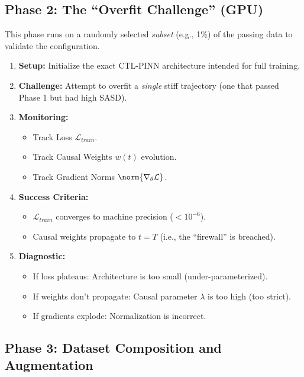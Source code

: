 \subsection{Phase 2: The ``Overfit Challenge'' (GPU)}
This phase runs on a randomly selected \textit{subset} (e.g., 1\%) of the passing data to validate the configuration.

\begin{enumerate}
    \item \textbf{Setup:} Initialize the exact CTL-PINN architecture intended for full training.
    \item \textbf{Challenge:} Attempt to overfit a \textit{single} stiff trajectory (one that passed Phase 1 but had high SASD).
    \item \textbf{Monitoring:}
    \begin{itemize}
        \item Track Loss $\mathcal{L}_{train}$.
        \item Track Causal Weights $w(t)$ evolution.
        \item Track Gradient Norms $\norm{\nabla_\theta \mathcal{L}}$.
    \end{itemize}
    \item \textbf{Success Criteria:}
    \begin{itemize}
        \item $\mathcal{L}_{train}$ converges to machine precision ($< 10^{-6}$).
        \item Causal weights propagate to $t=T$ (i.e., the ``firewall'' is breached).
    \end{itemize}
    \item \textbf{Diagnostic:}
    \begin{itemize}
        \item If loss plateaus: Architecture is too small (under-parameterized).
        \item If weights don't propagate: Causal parameter $\lambda$ is too high (too strict).
        \item If gradients explode: Normalization is incorrect.
    \end{itemize}
\end{enumerate}

\subsection{Phase 3: Dataset Composition and Augmentation}

